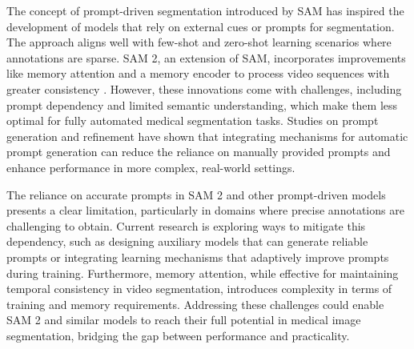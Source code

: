The concept of prompt-driven segmentation introduced by SAM has inspired the development of models that rely on external cues or prompts for segmentation. The approach aligns well with few-shot and zero-shot learning scenarios where annotations are sparse. SAM 2, an extension of SAM, incorporates improvements like memory attention and a memory encoder to process video sequences with greater consistency \cite{kirillov2023segment}. However, these innovations come with challenges, including prompt dependency and limited semantic understanding, which make them less optimal for fully automated medical segmentation tasks. Studies on prompt generation \cite{shaharabany2023autosam} and refinement have shown that integrating mechanisms for automatic prompt generation can reduce the reliance on manually provided prompts and enhance performance in more complex, real-world settings.

The reliance on accurate prompts in SAM 2 and other prompt-driven models presents a clear limitation, particularly in domains where precise annotations are challenging to obtain. Current research is exploring ways to mitigate this dependency, such as designing auxiliary models that can generate reliable prompts or integrating learning mechanisms that adaptively improve prompts during training. Furthermore, memory attention, while effective for maintaining temporal consistency in video segmentation, introduces complexity in terms of training and memory requirements. Addressing these challenges could enable SAM 2 and similar models to reach their full potential in medical image segmentation, bridging the gap between performance and practicality.





